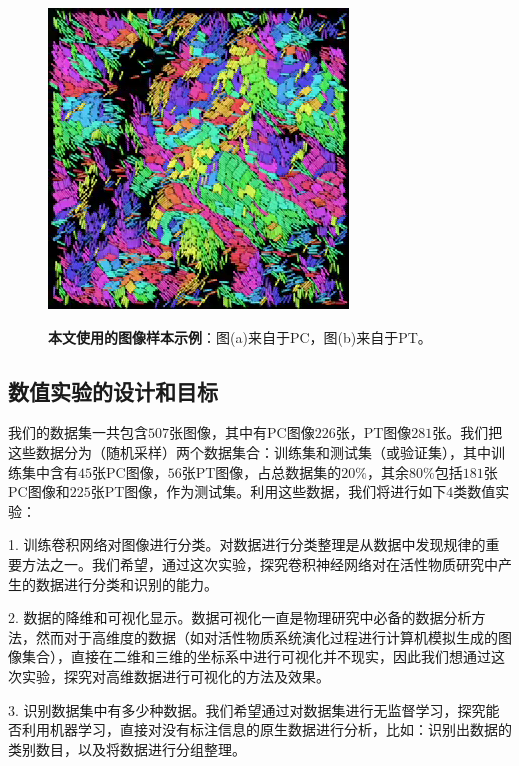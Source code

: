 \begin{figure}[H]
{\begin{minipage}[b]{0.40\textwidth}
			\includegraphics[width=\linewidth]{../figures/PT.png}
		\end{minipage}
		\label{fig:pt}
	}
	\caption{\textbf{本文使用的图像样本示例}：图(a)来自于PC，图(b)来自于PT。}
	\label{fig:ms}
\end{figure}

\subsection{数值实验的设计和目标}
我们的数据集一共包含$507$张图像，其中有PC图像$226$张，PT图像$281$张。我们把这些数据分为（随机采样）两个数据集合：训练集和测试集（或验证集），其中训练集中含有$45$张PC图像，$56$张PT图像，占总数据集的$20\%$，其余$80\%$包括$181$张PC图像和$225$张PT图像，作为测试集。利用这些数据，我们将进行如下4类数值实验：

1. 训练卷积网络对图像进行分类。对数据进行分类整理是从数据中发现规律的重要方法之一。我们希望，通过这次实验，探究卷积神经网络对在活性物质研究中产生的数据进行分类和识别的能力。

2. 数据的降维和可视化显示。数据可视化一直是物理研究中必备的数据分析方法，然而对于高维度的数据（如对活性物质系统演化过程进行计算机模拟生成的图像集合），直接在二维和三维的坐标系中进行可视化并不现实，因此我们想通过这次实验，探究对高维数据进行可视化的方法及效果。

3. 识别数据集中有多少种数据。我们希望通过对数据集进行无监督学习，探究能否利用机器学习，直接对没有标注信息的原生数据进行分析，比如：识别出数据的类别数目，以及将数据进行分组整理。

